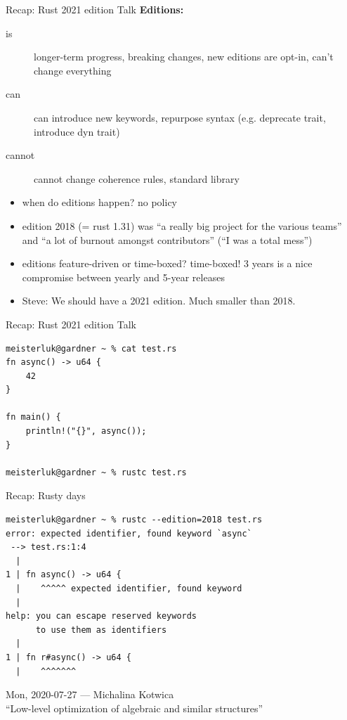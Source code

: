\documentclass{beamer}
\begin{document}
\begin{frame}[fragile]{Recap: Rust 2021 edition Talk}
  \textbf{Editions:}
  \begin{description}
    \item[is] longer-term progress, breaking changes, new editions are opt-in, can't change everything
    \item[can] can {introduce new keywords, repurpose syntax (e.g. deprecate trait, introduce dyn trait)}
    \item[cannot] cannot {change coherence rules, standard library}
  \end{description}
  \begin{itemize}
    \item when do editions happen? no policy
    \item edition 2018 (= rust 1.31) was \enquote{a really big project for the various teams} and \enquote{a lot of burnout amongst contributors} (\enquote{I was a total mess})
    \item editions feature-driven or time-boxed? time-boxed! 3 years is a nice compromise between yearly and 5-year releases
    \item Steve: We should have a 2021 edition. Much smaller than 2018.
  \end{itemize}
\end{frame}

\begin{frame}[fragile]{Recap: Rust 2021 edition Talk}
  \begin{verbatim}
meisterluk@gardner ~ % cat test.rs
fn async() -> u64 {
    42
}

fn main() {
    println!("{}", async());
}

meisterluk@gardner ~ % rustc test.rs
  \end{verbatim}
\end{frame}

\begin{frame}[fragile]{Recap: Rusty days}
  \begin{verbatim}
meisterluk@gardner ~ % rustc --edition=2018 test.rs
error: expected identifier, found keyword `async`
 --> test.rs:1:4
  |
1 | fn async() -> u64 {
  |    ^^^^^ expected identifier, found keyword
  |
help: you can escape reserved keywords
      to use them as identifiers
  |
1 | fn r#async() -> u64 {
  |    ^^^^^^^
  \end{verbatim}
\end{frame}

\begin{frame}[standout]
  Mon, 2020-07-27 --- Michalina Kotwica \\
  \enquote{Low-level optimization of algebraic and similar structures}
\end{frame}
\end{document}
